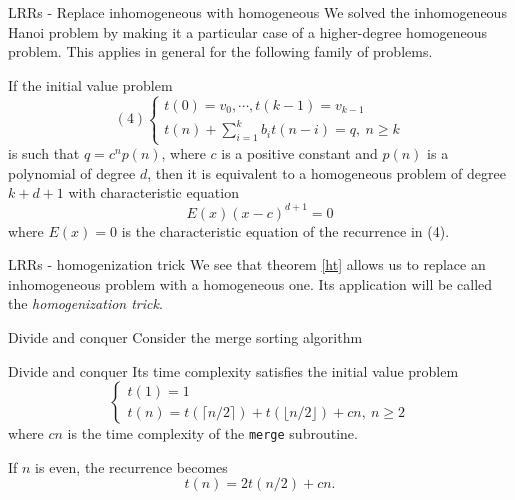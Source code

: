 \documentclass{beamer}
\begin{document}
\begin{frame}{LRRs - Replace inhomogeneous with homogeneous}
	We solved the inhomogeneous Hanoi problem by making it a particular case
	of a higher-degree homogeneous problem. This applies in general for the
	following family of problems.
	\begin{thm}[2]\label{ht}
		If the initial value problem
		\begin{displaymath}(4)
			\begin{cases}
				t(0)= v_0, \cdots, t(k-1)= v_{k-1}\\
				t(n) + \sum_{i= 1}^k b_it(n-i)= q,\ n \geq k
			\end{cases}
		\end{displaymath}
		is such that $q = c^np(n)$, where $c$ is a positive constant and
		$p(n)$ is a polynomial of degree $d$, then it is equivalent to a
		homogeneous problem of degree $k+d+1$ with characteristic equation
		\begin{equation*}
			E(x)(x-c)^{d+1} = 0
		\end{equation*}
		where $E(x) = 0$ is the characteristic equation of the recurrence
		in (4).
	\end{thm}
\end{frame}

%

\begin{frame}{LRRs - homogenization trick}
	We see that theorem \ref{ht} allows us to replace an inhomogeneous problem
	with a homogeneous one. Its application will be called the
	\emph{homogenization trick}.
\end{frame}

\begin{frame}{Divide and conquer}
	Consider the merge sorting algorithm
	
\end{frame}

%

\begin{frame}{Divide and conquer}
	Its time complexity satisfies the initial value problem
	\begin{displaymath}
		\begin{cases}
			t(1)= 1\\
			t(n)= t\left( \lceil n/2 \rceil \right) +
			t\left( \lfloor n/2 \rfloor \right) + cn,\ n \geq 2
		\end{cases}
	\end{displaymath}
	where $cn$ is the time complexity of the \texttt{merge} subroutine.
	
	If $n$ is even, the recurrence becomes
	\[
		t(n)= 2t(n/2) + cn.
	\]
\end{frame}
\end{document}
